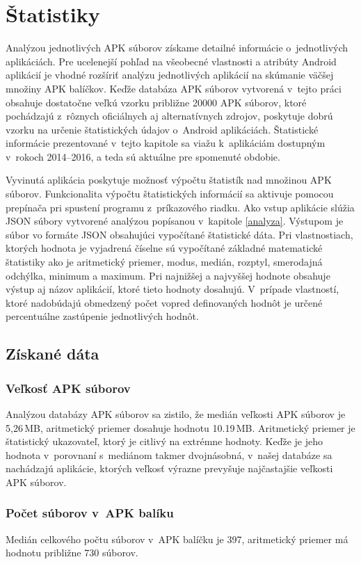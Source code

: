 \chapter{Štatistiky}
\label{statistiky}
Analýzou jednotlivých APK súborov získame detailné informácie o~jednotlivých aplikáciách. Pre ucelenejší pohľad na všeobecné vlastnosti a atribúty Android aplikácií je vhodné rozšíriť analýzu jednotlivých aplikácií na skúmanie väčšej množiny APK balíčkov. Keďže databáza APK súborov vytvorená v~tejto práci obsahuje dostatočne veľkú vzorku približne 20000 APK súborov, ktoré pochádzajú z~rôznych oficiálnych aj alternatívnych zdrojov, poskytuje dobrú vzorku na určenie štatistických údajov o~Android aplikáciách. Štatistické informácie prezentované v~tejto kapitole sa viažu k~aplikáciám dostupným v~rokoch 2014--2016, a teda sú aktuálne pre spomenuté obdobie.

Vyvinutá aplikácia  poskytuje možnosť výpočtu štatistík nad množinou APK súborov. Funkcionalita výpočtu štatistických informácií sa aktivuje pomocou prepínača  pri spustení programu z~príkazového riadku. Ako vstup aplikácie slúžia JSON súbory vytvorené analýzou popísanou v~kapitole \ref{analyza}. Výstupom je súbor vo formáte JSON obsahujúci vypočítané štatistické dáta. Pri vlastnostiach, ktorých hodnota je vyjadrená číselne sú vypočítané základné matematické štatistiky ako je aritmetický priemer, modus, medián, rozptyl, smerodajná odchýlka, minimum a maximum. Pri najnižšej a najvyššej hodnote obsahuje výstup aj názov aplikácií, ktoré tieto hodnoty dosahujú. V~prípade vlastností, ktoré nadobúdajú obmedzený počet vopred definovaných hodnôt je určené percentuálne zastúpenie jednotlivých hodnôt.

\section{Získané dáta}
\subsection*{Veľkosť APK súborov}
Analýzou databázy APK súborov sa zistilo, že medián veľkosti APK súborov je 5,26\,MB, aritmetický priemer dosahuje hodnotu 10.19\,MB. Aritmetický priemer je štatistický ukazovateľ, ktorý je citlivý na extrémne hodnoty. Keďže je jeho hodnota v~porovnaní s~mediánom takmer dvojnásobná, v~našej databáze sa nachádzajú aplikácie, ktorých veľkosť výrazne prevyšuje najčastajšie veľkosti APK súborov.

\subsection*{Počet súborov v~APK balíku}
Medián celkového počtu súborov v~APK balíčku je 397, aritmetický priemer má hodnotu približne 730 súborov. 

